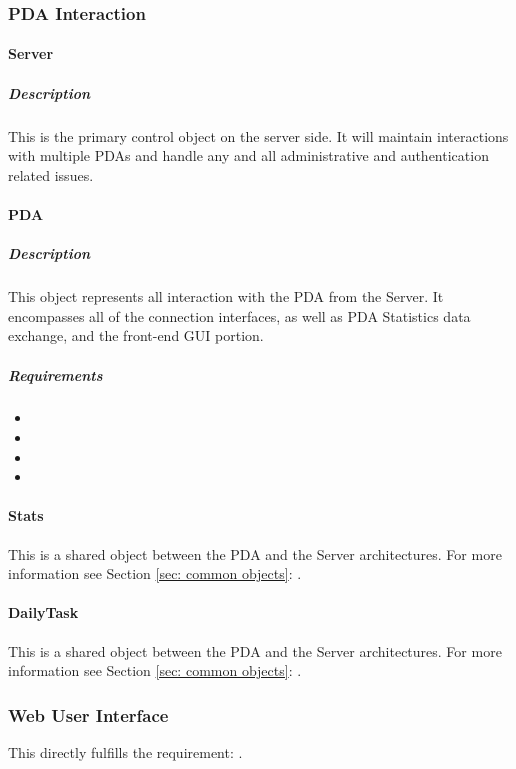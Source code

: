 \documentclass{article}
\begin{document}
\subsubsection{PDA Interaction}

\paragraph{Server}
\subparagraph{Description}
This is the primary control object on the server side. It will maintain interactions with multiple PDAs and handle any and all administrative and authentication related issues.

\paragraph{PDA}
\subparagraph{Description}
This object represents all interaction with the PDA from the Server. It encompasses all of the connection interfaces, as well as PDA Statistics data exchange, and the front-end GUI portion. 
\subparagraph{Requirements}
\begin{itemize}
\item {}
\item {}
\item {}
\item {}
\end{itemize}

\paragraph{Stats}
This is a shared object between the PDA and the Server architectures. For more information see Section \ref{sec: common objects}: .

\paragraph{DailyTask}
This is a shared object between the PDA and the Server architectures. For more information see Section \ref{sec: common objects}: .

\subsubsection{Web User Interface}

This directly fulfills the requirement: . 
\end{document}
